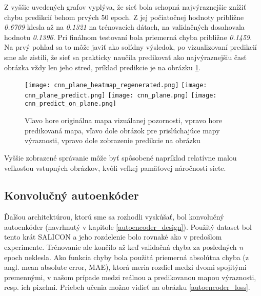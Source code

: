 Z vyššie uvedených grafov vyplýva, že sieť bola schopná najvýraznejšie znížiť chybu predikcií behom prvých 50 epoch. Z jej počiatočnej hodnoty približne \textit{0.6709} klesla až na \textit{0.1321} na trénovacích dátach, na validačných dosahovala hodnotu \textit{0.1396}. Pri finálnom testovaní bola priemerná chyba približne \textit{0.1459}. Na prvý pohľad sa to môže javiť ako solídny výsledok, po vizualizovaní predikcií sme ale zistili, že sieť sa prakticky naučila predikovať ako najvýraznejšiu časť obrázka vždy len jeho stred, príklad predikcie je na obrázku \ref{cnn_results}.

\begin{figure}[H]
	\begin{center}
		
		\texttt{[image: cnn\_plane\_heatmap\_regenerated.png]}
		\texttt{[image: cnn\_plane\_predict.png]}
		\texttt{[image: cnn\_plane.png]}
		\texttt{[image: cnn\_predict\_on\_plane.png]}
		\caption[Vzorka predikcie konvolučnej neurónovej siete]{
			Vľavo hore originálna mapa vizuálanej pozornosti, vpravo hore predikovaná mapa, vľavo dole obrázok pre prislúchajúce mapy výraznosti, vpravo dole zobrazenie predikcie na obrázku
		}\label{cnn_results}
	\end{center}
\end{figure}

Vyššie zobrazené správanie môže byť spôsobené napríklad relatívne malou veľkosťou vstupných obrázkov, kvôli veľkej pamäťovej náročnosti siete. 

\subsection{Konvolučný autoenkóder}
\label{experiments_autoencoder}

Ďalšou architektúrou, ktorú sme sa rozhodli vyskúšať, bol konvolučný autoenkóder (navrhnutý v kapitole \ref{autoencoder_design}). Použitý dataset bol tento krát SALICON a jeho rozdelenie bolo rovnaké ako v predošlom experimente. Trénovanie ale končilo až keď validačná chyba za posledných \textit{n} epoch neklesla. Ako funkcia chyby bola použitá priemerná absolútna chyba (z angl. mean absolute error, MAE), ktorá meria rozdiel medzi dvomi spojitými premennými, v našom prípade medzi reálnou a predikovanou mapou výraznosti, resp. ich pixelmi. Priebeh učenia možno vidieť na obrázku \ref{autoencoder_loss}. 

